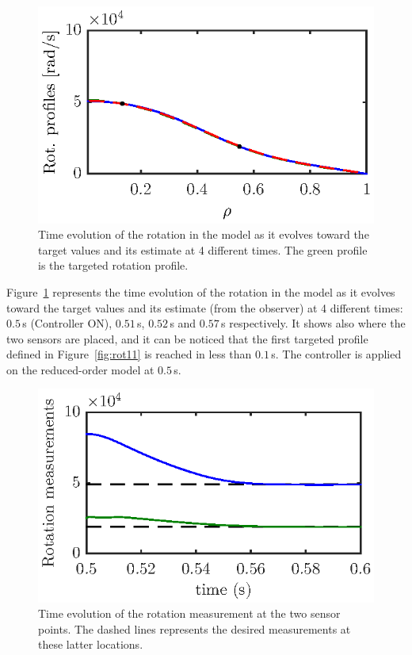 \documentclass[12pt]{iopart}
\begin{document}
\begin{figure}
	\includegraphics{imene_figs/fig14d} %
	\caption{Time evolution of the rotation in the model as it evolves toward the target values and its estimate at 4 different times. The green profile is the targeted rotation profile. }
	\label{fig:rot18}
\end{figure}


Figure~\ref{fig:rot18} represents the time evolution of the rotation in the model as it evolves toward the target values and its estimate (from the observer) at 4 different times: $0.5$\,s (Controller ON), $0.51$\,s, $0.52$\,s and $0.57$\,s respectively. It shows also where the two sensors are placed, and it can be noticed that the first targeted profile defined in Figure~\ref{fig:rot11} is reached in less than $0.1$\,s. The controller is applied on the reduced-order model at $0.5$\,s.
\begin{figure}
\centering
\includegraphics{imene_figs/fig15} %
\caption{Time evolution of the rotation measurement at the two sensor points. The dashed lines represents the desired measurements at these latter locations. }
\label{fig:rot20}
\end{figure}    
\end{document}
